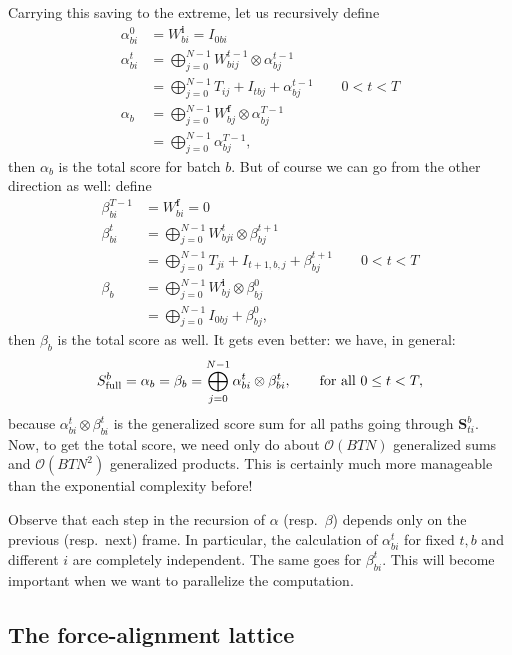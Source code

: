 \documentclass[a4paper]{article}
\begin{document}
Carrying this saving to the extreme, let us recursively define
\begin{align}
\alpha^0_{bi} &= W^{\mathbf{i}}_{bi} =I_{0bi} \\
\alpha^t_{bi} &= \bigoplus_{j=0}^{N-1} W^{t-1}_{bij}\otimes \alpha^{t-1}_{bj} \\
&= \bigoplus_{j=0}^{N-1} T_{ij} + I_{tbj} + \alpha^{t-1}_{bj} \qquad 0 < t < T \\
\alpha_b &= \bigoplus_{j=0}^{N-1} W^{\mathbf{f}}_{bj} \otimes \alpha^{T-1}_{bj}\\
&= \bigoplus_{j=0}^{N-1} \alpha^{T-1}_{bj},
\end{align}
then $\alpha_b$ is the total score for batch $b$. But of course we can go from the other direction as well: define
\begin{align}
\beta^{T-1}_{bi} &= W^{\mathbf{f}}_{bi} = 0 \\
\beta^{t}_{bi} &= \bigoplus_{j=0}^{N-1}W^{t}_{bji}\otimes \beta^{t+1}_{bj} \\
&= \bigoplus_{j=0}^{N-1} T_{ji} + I_{t+1,b,j} + \beta^{t+1}_{bj} \qquad 0 < t < T\\
\beta_{b} &= \bigoplus_{j=0}^{N-1}W^{\mathbf{i}}_{bj}\otimes \beta^{0}_{bj} \\
&= \bigoplus_{j=0}^{N-1}I_{0bj}+ \beta^{0}_{bj},
\end{align}
then $\beta_b$ is the total score as well. It gets even better: we have, in general:
\begin{equation}
S^b_{\rm{full}} = \alpha_b = \beta_b = \bigoplus_{j=0}^{N-1}\alpha^t_{bi}\otimes \beta^t_{bi},\qquad \textrm{for all } 0 \leq t < T,
\end{equation}
because $\alpha^t_{bi}\otimes \beta^t_{bi}$ is the generalized score sum for all paths going through $\mathbf{S}^b_{ti}$. Now, to get the total score, we need only do about $\mathcal{O}(BTN)$ generalized sums and $\mathcal{O}(BTN^2)$ generalized products. This is certainly much more manageable than the exponential complexity before!

Observe that each step in the recursion of $\alpha$ (resp.~$\beta$) depends only on the previous (resp.~next) frame. In particular, the calculation of $\alpha^t_{bi}$ for fixed $t, b$ and different $i$ are completely independent. The same goes for $\beta^{t}_{bi}$. This will become important when we want to parallelize the computation.


\subsection{The force-alignment lattice}
\end{document}
